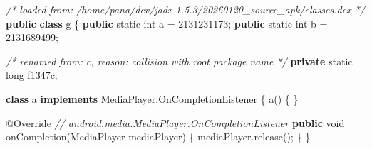 \documentclass[
]{article}
\newenvironment{Shaded}{}{}
\newcommand{\AttributeTok}[1]{\textcolor[rgb]{0.49,0.56,0.16}{#1}}
\newcommand{\CommentTok}[1]{\textcolor[rgb]{0.38,0.63,0.69}{\textit{#1}}}
\newcommand{\DataTypeTok}[1]{\textcolor[rgb]{0.56,0.13,0.00}{#1}}
\newcommand{\DecValTok}[1]{\textcolor[rgb]{0.25,0.63,0.44}{#1}}
\newcommand{\FunctionTok}[1]{\textcolor[rgb]{0.02,0.16,0.49}{#1}}
\newcommand{\KeywordTok}[1]{\textcolor[rgb]{0.00,0.44,0.13}{\textbf{#1}}}
\newcommand{\NormalTok}[1]{#1}
\newcommand{\OperatorTok}[1]{\textcolor[rgb]{0.40,0.40,0.40}{#1}}
\begin{document}
\begin{Shaded}
\begin{Highlighting}[]
\CommentTok{/* loaded from: /home/pana/dev/jadx{-}1.5.3/20260120\_source\_apk/classes.dex */}
\KeywordTok{public} \KeywordTok{class}\NormalTok{ g }\OperatorTok{\{}
    \KeywordTok{public} \DataTypeTok{static} \DataTypeTok{int}\NormalTok{ a }\OperatorTok{=} \DecValTok{2131231173}\OperatorTok{;}
    \KeywordTok{public} \DataTypeTok{static} \DataTypeTok{int}\NormalTok{ b }\OperatorTok{=} \DecValTok{2131689499}\OperatorTok{;}

    \CommentTok{/* renamed from: c, reason: collision with root package name */}
    \KeywordTok{private} \DataTypeTok{static} \DataTypeTok{long}\NormalTok{ f1347c}\OperatorTok{;}

    \KeywordTok{class}\NormalTok{ a }\KeywordTok{implements}\NormalTok{ MediaPlayer}\OperatorTok{.}\FunctionTok{OnCompletionListener} \OperatorTok{\{}
        \FunctionTok{a}\OperatorTok{()} \OperatorTok{\{}
        \OperatorTok{\}}

        \AttributeTok{@Override} \CommentTok{// android.media.MediaPlayer.OnCompletionListener}
        \KeywordTok{public} \DataTypeTok{void} \FunctionTok{onCompletion}\OperatorTok{(}\NormalTok{MediaPlayer mediaPlayer}\OperatorTok{)} \OperatorTok{\{}
\NormalTok{            mediaPlayer}\OperatorTok{.}\FunctionTok{release}\OperatorTok{();}
        \OperatorTok{\}}
    \OperatorTok{\}}


\end{Highlighting}
\end{Shaded}
\end{document}

